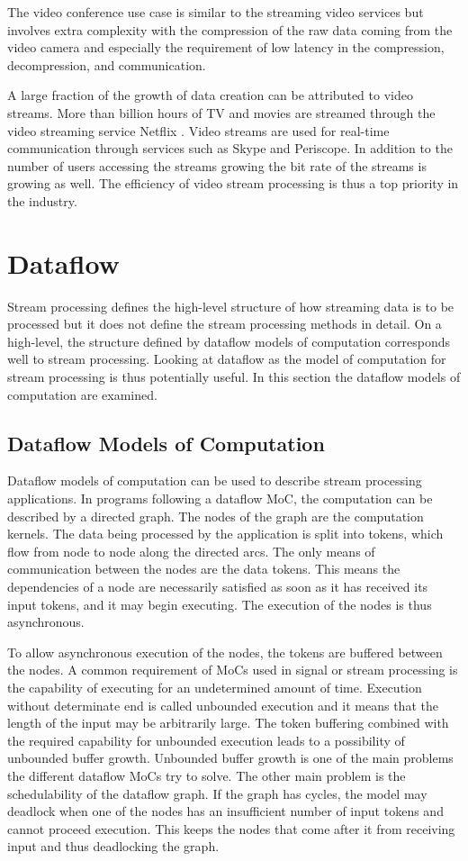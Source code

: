 The video conference use case is similar to the streaming video services but involves extra complexity with the compression of the raw data coming from the video camera and especially the requirement of low latency in the compression, decompression, and communication.

A large fraction of the growth of data creation can be attributed to video streams. More than billion hours of TV and movies are streamed through the video streaming service Netflix \cite{turner2014digital}. Video streams are used for real-time communication through services such as Skype and Periscope. In addition to the number of users accessing the streams growing the bit rate of the streams is growing as well. The efficiency of video stream processing is thus a top priority in the industry.

\section{Dataflow}
\label{sec:dataflow-models}
Stream processing defines the high-level structure of how streaming data is to be processed but it does not define the stream processing methods in detail. On a high-level, the structure defined by dataflow models of computation corresponds well to stream processing. Looking at dataflow as the model of computation for stream processing is thus potentially useful. In this section the dataflow models of computation are examined.

\subsection{Dataflow Models of Computation}
\label{subsec:dataflow-moc}
Dataflow models of computation can be used to describe stream processing applications. In programs following a dataflow MoC, the computation can be described by a directed graph. The nodes of the graph are the computation kernels. The data being processed by the application is split into tokens, which flow from node to node along the directed arcs. The only means of communication between the nodes are the data tokens. This means the dependencies of a node are necessarily satisfied as soon as it has received its input tokens, and it may begin executing. The execution of the nodes is thus asynchronous.~\cite{lee2015introduction}

To allow asynchronous execution of the nodes, the tokens are buffered between the nodes. A common requirement of MoCs used in signal or stream processing is the capability of executing for an undetermined amount of time. Execution without determinate end is called unbounded execution and it means that the length of the input may be arbitrarily large. The token buffering combined with the required capability for unbounded execution leads to a possibility of unbounded buffer growth. Unbounded buffer growth is one of the main problems the different dataflow MoCs try to solve. The other main problem is the schedulability of the dataflow graph. If the graph has cycles, the model may deadlock when one of the nodes has an insufficient number of input tokens and cannot proceed execution. This keeps the nodes that come after it from receiving input and thus deadlocking the graph.~\cite{lee2015introduction}

